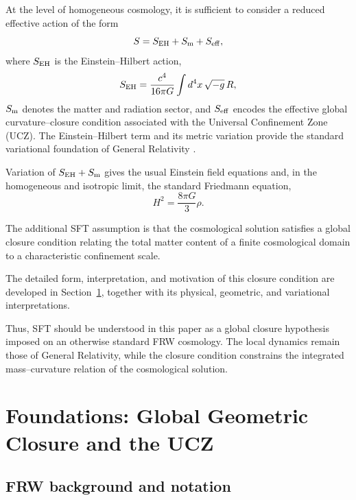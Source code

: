 \documentclass[12pt]{article}
\begin{document}
At the level of homogeneous cosmology, it is sufficient to consider a reduced
effective action of the form
\begin{equation}
S = S_{\rm EH} + S_{\rm m} + S_{\rm eff},
\end{equation}
where $S_{\rm EH}$ is the Einstein--Hilbert action,
\begin{equation}
S_{\rm EH}
=
\frac{c^4}{16\pi G}
\int d^4x\,\sqrt{-g}\,R,
\end{equation}
$S_{\rm m}$ denotes the matter and radiation sector, and $S_{\rm eff}$
encodes the effective global curvature--closure condition associated with
the Universal Confinement Zone (UCZ). The Einstein--Hilbert term and its
metric variation provide the standard variational foundation of General
Relativity \cite{Einstein1916,Carroll2001,Weinberg2008}.

Variation of $S_{\rm EH}+S_{\rm m}$ gives the usual Einstein field equations
and, in the homogeneous and isotropic limit, the standard Friedmann equation,
\begin{equation}
H^2 = \frac{8\pi G}{3}\rho .
\end{equation}

The additional SFT assumption is that the cosmological solution satisfies
a global closure condition relating the total matter content of a finite
cosmological domain to a characteristic confinement scale.

The detailed form, interpretation, and motivation of this closure
condition are developed in Section~\ref{sec:foundations}, together
with its physical, geometric, and variational interpretations.

Thus, SFT should be understood in this paper as a global closure
hypothesis imposed on an otherwise standard FRW cosmology. The local
dynamics remain those of General Relativity, while the closure condition
constrains the integrated mass--curvature relation of the cosmological
solution.



\section{Foundations: Global Geometric Closure and the UCZ}
\label{sec:foundations}

\subsection{FRW background and notation}
\end{document}
